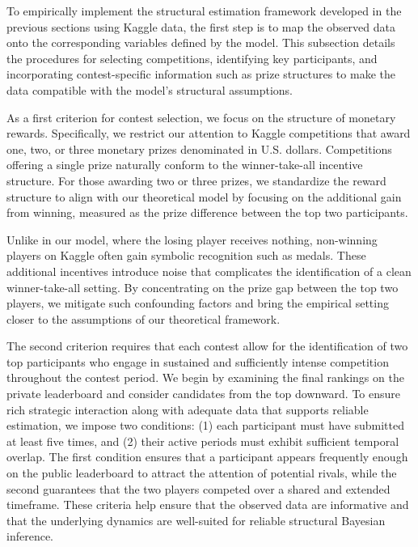 \documentclass[mnsc]{informs3}
\begin{document}
To empirically implement the structural estimation framework developed in the previous sections using Kaggle data, the first step is to map the observed data onto the corresponding variables defined by the model.
This subsection details the procedures for selecting competitions, identifying key participants, and incorporating contest-specific information such as prize structures to make the data compatible with the model’s structural assumptions.

As a first criterion for contest selection, we focus on the structure of monetary rewards.
Specifically, we restrict our attention to Kaggle competitions that award one, two, or three monetary prizes denominated in U.S. dollars.
Competitions offering a single prize naturally conform to the winner-take-all incentive structure. 
For those awarding two or three prizes, we standardize the reward structure to align with our theoretical model by focusing on the additional gain from winning, measured as the prize difference between the top two participants.

Unlike in our model, where the losing player receives nothing, non-winning players on Kaggle often gain symbolic recognition such as medals. 
These additional incentives introduce noise that complicates the identification of a clean winner-take-all setting.
By concentrating on the prize gap between the top two players, we mitigate such confounding factors and bring the empirical setting closer to the assumptions of our theoretical framework.

The second criterion requires that each contest allow for the identification of two top participants who engage in sustained and sufficiently intense competition throughout the contest period.
We begin by examining the final rankings on the private leaderboard and consider candidates from the top downward. 
To ensure rich strategic interaction along with adequate data that supports reliable estimation, we impose two conditions: (1) each participant must have submitted at least five times, and (2) their active periods must exhibit sufficient temporal overlap. 
The first condition ensures that a participant appears frequently enough on the public leaderboard to attract the attention of potential rivals, while the second guarantees that the two players competed over a shared and extended timeframe. 
These criteria help ensure that the observed data are informative and that the underlying dynamics are well-suited for reliable structural Bayesian inference.
\end{document}
